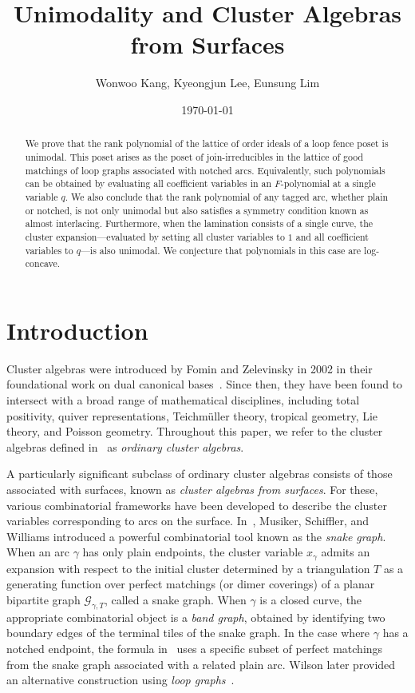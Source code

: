 \documentclass{article}
\title{Unimodality and Cluster Algebras from Surfaces}
\author{Wonwoo Kang, Kyeongjun Lee, Eunsung Lim}
\date{\today}
\theoremstyle{remark}
\begin{document}
\maketitle

\begin{abstract}
We prove that the rank polynomial of the lattice of order ideals of a loop fence poset is unimodal. This poset arises as the poset of join-irreducibles in the lattice of good matchings of loop graphs associated with notched arcs. Equivalently, such polynomials can be obtained by evaluating all coefficient variables in an $F$-polynomial at a single variable $q$. We also conclude that the rank polynomial of any tagged arc, whether plain or notched, is not only unimodal but also satisfies a symmetry condition known as almost interlacing. Furthermore, when the lamination consists of a single curve, the cluster expansion—evaluated by setting all cluster variables to $1$ and all coefficient variables to $q$—is also unimodal. We conjecture that polynomials in this case are log-concave.
\end{abstract}

\tableofcontents

\section{Introduction}

Cluster algebras were introduced by Fomin and Zelevinsky in 2002 in their foundational work on dual canonical bases~\cite{FZ2002}. Since then, they have been found to intersect with a broad range of mathematical disciplines, including total positivity, quiver representations, Teichm\"uller theory, tropical geometry, Lie theory, and Poisson geometry. Throughout this paper, we refer to the cluster algebras defined in~\cite{FZ2002} as \emph{ordinary cluster algebras}.

A particularly significant subclass of ordinary cluster algebras consists of those associated with surfaces, known as \emph{cluster algebras from surfaces}. For these, various combinatorial frameworks have been developed to describe the cluster variables corresponding to arcs on the surface. In~\cite{musiker2011positivity}, Musiker, Schiffler, and Williams introduced a powerful combinatorial tool known as the \emph{snake graph}. When an arc $\gamma$ has only plain endpoints, the cluster variable $x_\gamma$ admits an expansion with respect to the initial cluster determined by a triangulation $T$ as a generating function over perfect matchings (or dimer coverings) of a planar bipartite graph $\mathcal{G}_{\gamma, T}$, called a snake graph. When $\gamma$ is a closed curve, the appropriate combinatorial object is a \emph{band graph}, obtained by identifying two boundary edges of the terminal tiles of the snake graph. In the case where $\gamma$ has a notched endpoint, the formula in~\cite{musiker2011positivity} uses a specific subset of perfect matchings from the snake graph associated with a related plain arc. Wilson later provided an alternative construction using \emph{loop graphs}~\cite{wilson2020surface}.
\end{document}
